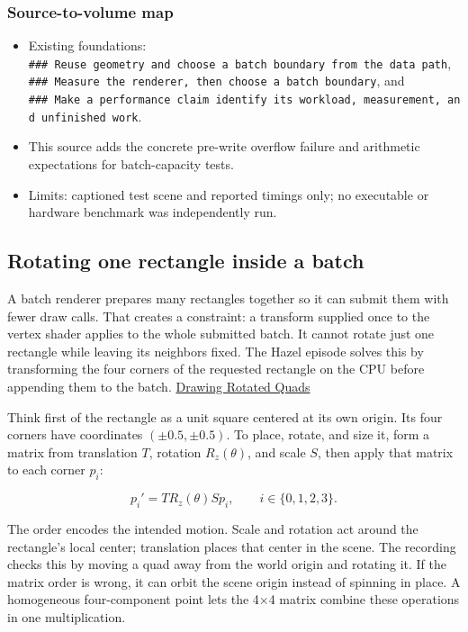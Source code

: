 \subsubsection{Source-to-volume map}\label{06-engine-ii-ch026-source-to-volume-map-3}

\begin{itemize}
\tightlist
\item
  Existing foundations: \texttt{\#\#\#\ Reuse\ geometry\ and\ choose\ a\ batch\ boundary\ from\ the\ data\ path}, \texttt{\#\#\#\ Measure\ the\ renderer,\ then\ choose\ a\ batch\ boundary}, and \texttt{\#\#\#\ Make\ a\ performance\ claim\ identify\ its\ workload,\ measurement,\ and\ unfinished\ work}.
\item
  This source adds the concrete pre-write overflow failure and arithmetic expectations for batch-capacity tests.
\item
  Limits: captioned test scene and reported timings only; no executable or hardware benchmark was independently run.
\end{itemize}

\subsection{Rotating one rectangle inside a batch}\label{06-engine-ii-ch026-rotating-one-rectangle-inside-a-batch}

A batch renderer prepares many rectangles together so it can submit them with fewer draw calls. That creates a constraint: a transform supplied once to the vertex shader applies to the whole submitted batch. It cannot rotate just one rectangle while leaving its neighbors fixed. The Hazel episode solves this by transforming the four corners of the requested rectangle on the CPU before appending them to the batch. \href{https://www.youtube.com/watch?v=-SQ8TlFZHbY}{Drawing Rotated Quads}

Think first of the rectangle as a unit square centered at its own origin. Its four corners have coordinates \((\pm 0.5, \pm 0.5)\). To place, rotate, and size it, form a matrix from translation \(T\), rotation \(R_z(\theta)\), and scale \(S\), then apply that matrix to each corner \(p_i\):

\[p_i' = T R_z(\theta) S p_i, \qquad i \in \{0,1,2,3\}.\]

The order encodes the intended motion. Scale and rotation act around the rectangle's local center; translation places that center in the scene. The recording checks this by moving a quad away from the world origin and rotating it. If the matrix order is wrong, it can orbit the scene origin instead of spinning in place. A homogeneous four-component point lets the 4×4 matrix combine these operations in one multiplication.

